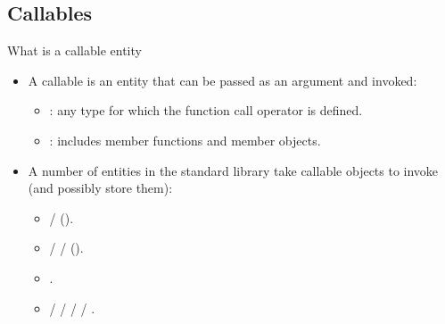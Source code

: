 \subsection{Callables}

\begin{frame}[t,fragile]{What is a callable entity}
\begin{itemize}
  \item A callable is an entity that can be passed as an argument and invoked:
    \begin{itemize}
      \item {}: any type 
        for which the function call operator is defined.

      \item {}: includes member functions and 
            member objects.
    \end{itemize}

  \item A number of entities in the standard library take callable objects
        to invoke (and possibly store them):
    \begin{itemize}
      \item {} / 
             ().
      \item {} / 
             /
             ().
      \item {}.
      \item {} /  /  /  / .
    \end{itemize}
\end{itemize}
\end{frame}
